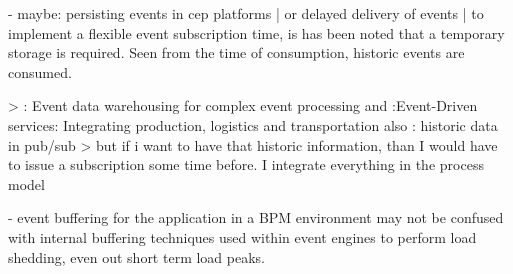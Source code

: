 - maybe: persisting events in cep platforms | or delayed delivery of events | 
to implement a flexible event subscription time, is has been noted that a temporary storage is required. Seen from the time of consumption, historic events are consumed.

> \cite{roth2010event}: Event data warehousing for complex event processing and \cite{buchmann2010event}:Event-Driven services: Integrating production, logistics and transportation
also \cite{li2007historic}: historic data in pub/sub
> but if i want to have that historic information, than I would have to issue a subscription some time before. I integrate everything in the process model

- event buffering for the application in a BPM environment may not be confused with internal buffering techniques used within event engines to perform load shedding, even out short term load peaks. 










